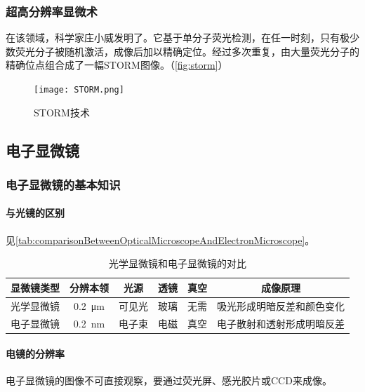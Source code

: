 \subsubsection{超高分辨率显微术}

在该领域，科学家庄小威发明了。它基于单分子荧光检测，在任一时刻，只有极少数荧光分子被随机激活，成像后加以精确定位。经过多次重复，由大量荧光分子的精确位点组合成了一幅STORM图像。（\autoref{fig:storm}）

\begin{figure}[htbp]
	\centering
	\texttt{[image: STORM.png]}
	\caption{STORM技术}
	\label{fig:storm}
\end{figure}

\subsection{电子显微镜}

\subsubsection{电子显微镜的基本知识}

\paragraph{与光镜的区别}

见\autoref{tab:comparisonBetweenOpticalMicroscopeAndElectronMicroscope}。

\begin{table}[htbp]
	\centering
	\begin{tabularx}{\textwidth}{|c|c|c|c|c|C|}
		\hline
		显微镜类型 & 分辨本领 & 光源 & 透镜 & 真空 & 成像原理 \\ \hline
		光学显微镜 & \SI{0.2}{\um} & 可见光 & 玻璃 & 无需 & 吸光形成明暗反差和颜色变化 \\ \hline
		电子显微镜 & \SI{0.2}{\nm} & 电子束 & 电磁 & 真空 & 电子散射和透射形成明暗反差 \\ \hline
	\end{tabularx}
	\caption{光学显微镜和电子显微镜的对比}
	\label{tab:comparisonBetweenOpticalMicroscopeAndElectronMicroscope}
\end{table}

\paragraph{电镜的分辨率}

电子显微镜的图像不可直接观察，要通过荧光屏、感光胶片或CCD来成像。

